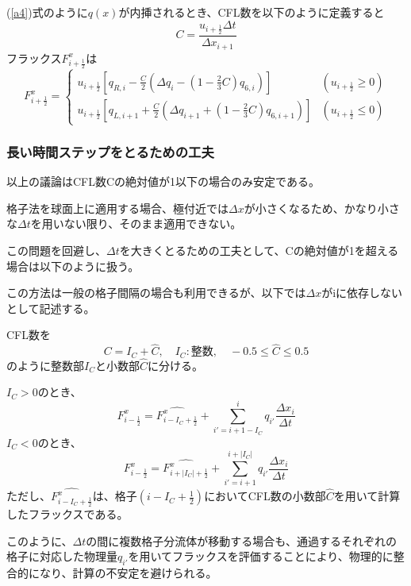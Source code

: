\documentclass{jsbook}
\begin{document}
(\ref{a4})式のように$q(x)$が内挿されるとき、CFL数を以下のように定義すると
\begin{equation}
  C=\frac{u_{i+\frac{1}{2}}\Delta t}{\Delta x_{i+1}}
\end{equation}
フラックス$F^{x}_{i+\frac{1}{2}}$は
\begin{equation}
  F^{x}_{i+\frac{1}{2}}=\begin{cases}u_{i+\frac{1}{2}}[q_{R,i}-\frac{C}{2}(\Delta q_{i}-(1-\frac{2}{3}C)q_{6,i})] & (u_{i+\frac{1}{2}}\ge0)\\
  u_{i+\frac{1}{2}}[q_{L,i+1}+\frac{C}{2}(\Delta q_{i+1}+(1-\frac{2}{3}C)q_{6,i+1})] & (u_{i+\frac{1}{2}}\leq0)
  \end{cases}
\end{equation}
\subsubsection{長い時間ステップをとるための工夫}
以上の議論はCFL数Cの絶対値が1以下の場合のみ安定である。

格子法を球面上に適用する場合、極付近では$\Delta x$が小さくなるため、かなり小さな$\Delta t$を用いない限り、そのまま適用できない。

この問題を回避し、$\Delta t$を大きくとるための工夫として、Cの絶対値が1を超える場合は以下のように扱う。

この方法は一般の格子間隔の場合も利用できるが、以下では$\Delta x$がiに依存しないとして記述する。

CFL数を
\begin{equation}
  C=I_{C}+\hat{C},\quad I_{C}:整数,\quad -0.5\le \hat{C} \le 0.5
\end{equation}
のように整数部$I_{C}$と小数部$\hat{C}$に分ける。

$I_{C}>0$のとき、
\begin{equation}
  F^{x}_{i-\frac{1}{2}}=\hat{F^{x}_{i-I_{C}+\frac{1}{2}}}+\sum^{i}_{i'=i+1-I_{C}} q_{i'} \frac{\Delta x_{i}}{\Delta t}
\end{equation}
$I_{C}<0$のとき、
\begin{equation}
  F^{x}_{i-\frac{1}{2}}=\hat{F^{x}_{i+|I_{C}|+\frac{1}{2}}}+\sum^{i+|I_{C}|}_{i'=i+1} q_{i'} \frac{\Delta x_{i}}{\Delta t}
\end{equation}
ただし、$\hat{F^{x}_{i-I_{C}+\frac{1}{2}}}$は、格子$(i-I_{C}+\frac{1}{2})$においてCFL数の小数部$\hat{C}$を用いて計算したフラックスである。

  このように、$\Delta t$の間に複数格子分流体が移動する場合も、通過するそれぞれの格子に対応した物理量$q_{i'}$を用いてフラックスを評価することにより、物理的に整合的になり、計算の不安定を避けられる。
\end{document}
